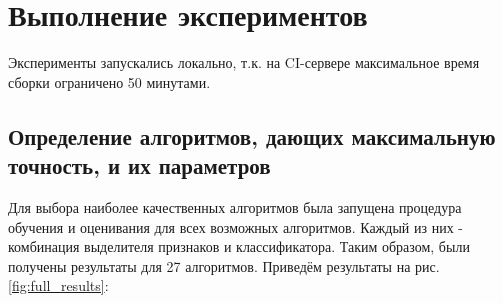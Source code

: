 

\section{Выполнение экспериментов}

Эксперименты запускались локально, т.к. на CI-сервере максимальное время сборки ограничено 50 минутами.

\subsection{Определение алгоритмов,  дающих максимальную точность, и их параметров}

Для выбора наиболее качественных алгоритмов была запущена процедура обучения и оценивания для всех возможных алгоритмов. Каждый из них - комбинация выделителя признаков и классификатора. Таким образом, были получены результаты для 27 алгоритмов. Приведём результаты на рис. \ref{fig:full_results}:


